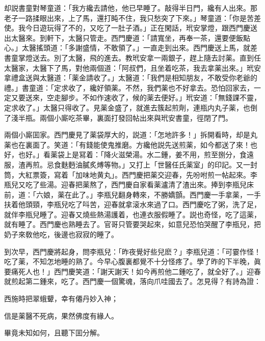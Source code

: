 却説書童對琴童道：「我方纔去請他，他已早睡了。敲得半日門，纔有人出來。那老子一路揉眼出來，上了馬，還打盹不住，我只愁突了下來。」琴童道：「你是苦差使。我今日遊玩得了不的，又吃了一肚子酒。」正在閑話，玳安掌燈，跟西門慶送出太醫來。到軒下，太醫只管走。西門慶道：「請寬坐，再奉一茶，還要便飯點心。」太醫搖頭道：「多謝盛情，不敢領了。」一直走到出來。西門慶送上馬，就差書童掌燈送去。別了太醫，飛的進去。教玳安拿一兩銀子，趕上隨去討薬。直到任太醫家，太醫下了馬，對他兩個道：「阿叔們，且坐着吃茶，我去拿薬出來。」玳安拿禮盒送與太醫道：「薬金請收了。」太醫道：「我們是相知朋友，不敢受你老爺的禮。」書童道：「定求收了，纔好領薬。不然，我們薬也不好拿去。恐怕回家去，一定又要送來，空走腳步。不如作速收了，候的薬去便好。」玳安道：「無錢課不靈，定求收了。」太醫只得收了。見薬金盛了，就進去簇起煎劑，連瓶内丸子薬，也倒了淺半瓶。兩個小廝吃茶畢，裏面打發回帖出來與玳安書童，徑閉了門。

兩個小廝囬家。西門慶見了薬袋厚大的，説道：「怎地許多！」拆開看時，却是丸薬也在裏面了。笑道：「有錢能使鬼推磨。方纔他説先送煎薬，如今都送了來！也好，也好。」看薬袋上是冩着：「降火滋榮湯。水二鍾，姜不用，煎至捌分，食遠服，渣再煎。忌食麩麪油膩炙煿等物。」又打上「世醫任氏薬室」的印記。又一封筒，大紅票簽，寫着「加味地黄丸」。西門慶把薬交迎春，先吩咐煎一帖起來。李瓶兒又吃了些湯。迎春把薬熬了，西門慶自家看薬瀘清了渣出來。捧到李瓶兒床前，道：「六娘，薬在此了。」李瓶兒翻身轉來，不勝嬌顫。西門慶一手拿薬，一手扶着他頭頸，李瓶兒吃了呌苦，迎春就拿滚水來過了口。西門慶吃了粥，洗了足，就伴李瓶兒睡了。迎春又燒些熱湯護着，也連衣服假睡了。説也奇怪，吃了這薬，就有睡了。西門慶也熟睡去了。官哥只管要哭起來，如意兒恐怕哭醒了李瓶兒，把奶子來敎他吃，後邊也寂寂的睡了。

到次早，西門慶將起身，問李瓶兒：「昨夜覺好些兒麽？」李瓶兒道：「可霎作怪！吃了薬，不知怎地睡的熟了。今早心腹裏都覺不十分怪疼了。學了昨的下半晚，眞要痛死人也！」西門慶笑道：「謝天謝天！如今再煎他二鍾吃了，就全好了。」迎春就煎起第二鍾來，吃了。西門慶一個驚魂，落向爪哇國去了。怎見得？有詩為證：

\begin{myquote}
西施時把翠蛾顰，幸有僊丹妙入神；

信是薬醫不死病，果然佛度有緣人。
\end{myquote}

畢竟未知如何，且聽下囬分解。

